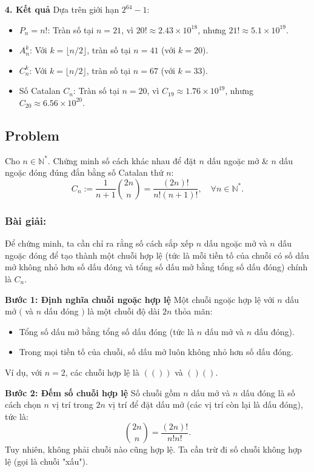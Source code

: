 \documentclass[a4paper,12pt]{article}
\begin{document}
\textbf{4. Kết quả}
Dựa trên giới hạn \( 2^{64} - 1 \):
\begin{itemize}
    \item \( P_n = n! \): Tràn số tại \( n = 21 \), vì \( 20! \approx 2.43 \times 10^{18} \), nhưng \( 21! \approx 5.1 \times 10^{19} \).
    \item \( A_n^k \): Với \( k = \lfloor n/2 \rfloor \), tràn số tại \( n = 41 \) (với \( k = 20 \)).
    \item \( C_n^k \): Với \( k = \lfloor n/2 \rfloor \), tràn số tại \( n = 67 \) (với \( k = 33 \)).
    \item Số Catalan \( C_n \): Tràn số tại \( n = 20 \), vì \( C_{19} \approx 1.76 \times 10^{19} \), nhưng \( C_{20} \approx 6.56 \times 10^{20} \).
\end{itemize}

\subsection*{Problem} Cho $n \in \mathbb{N}^*$. Chứng minh số cách khác nhau để đặt $n$ dấu ngoặc mở \& $n$ dấu ngoặc đóng đúng đắn bằng số Catalan thứ $n$:
\[
C_n := \frac{1}{n+1} \binom{2n}{n} = \frac{(2n)!}{n!(n+1)!}, \quad \forall n \in \mathbb{N}^*.
\]

\subsubsection*{Bài giải:}
Để chứng minh, ta cần chỉ ra rằng số cách sắp xếp \( n \) dấu ngoặc mở và \( n \) dấu ngoặc đóng để tạo thành một chuỗi hợp lệ (tức là mỗi tiền tố của chuỗi có số dấu mở không nhỏ hơn số dấu đóng và tổng số dấu mở bằng tổng số dấu đóng) chính là \( C_n \).

\textbf{Bước 1: Định nghĩa chuỗi ngoặc hợp lệ}
Một chuỗi ngoặc hợp lệ với \( n \) dấu mở \( ( \) và \( n \) dấu đóng \( ) \) là một chuỗi độ dài \( 2n \) thỏa mãn:
\begin{itemize}
    \item Tổng số dấu mở bằng tổng số dấu đóng (tức là \( n \) dấu mở và \( n \) dấu đóng).
    \item Trong mọi tiền tố của chuỗi, số dấu mở luôn không nhỏ hơn số dấu đóng.
\end{itemize}
Ví dụ, với \( n=2 \), các chuỗi hợp lệ là \( (()) \) và \( ()() \).

\textbf{Bước 2: Đếm số chuỗi hợp lệ}
Số chuỗi gồm \( n \) dấu mở và \( n \) dấu đóng là số cách chọn \( n \) vị trí trong \( 2n \) vị trí để đặt dấu mở (các vị trí còn lại là dấu đóng), tức là:
\[
\binom{2n}{n} = \frac{(2n)!}{n!n!}.
\]
Tuy nhiên, không phải chuỗi nào cũng hợp lệ. Ta cần trừ đi số chuỗi không hợp lệ (gọi là chuỗi "xấu").
\end{document}
